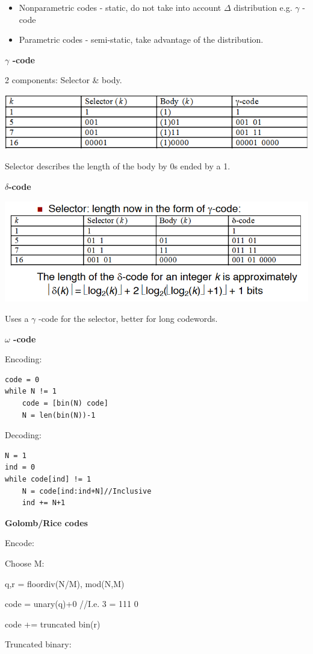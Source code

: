 \documentclass[a4paper,10pt,landscape]{article}
\begin{document}
\begin{multicols}{3}
\begin{itemize}
\item Nonparametric codes - static, do not take into account $\Delta$ distribution e.g. $\gamma$ -code
\item Parametric codes - semi-static, take advantage of the distribution.
\end{itemize}


\textbf{$\gamma$ -code}

2 components: Selector \& body.

\includegraphics[width=.75\linewidth]{images/gammacode.png}

Selector describes the length of the body by 0s ended by a 1.

\textbf{$\delta$-code}

\includegraphics[width=.75\linewidth]{images/deltacode.png}

Uses a $\gamma$ -code for the selector, better for long codewords.

\textbf{$\omega$ -code}

Encoding:
\begin{lstlisting}
code = 0
while N != 1
    code = [bin(N) code]
    N = len(bin(N))-1
\end{lstlisting}

Decoding:
\begin{lstlisting}
N = 1
ind = 0
while code[ind] != 1
    N = code[ind:ind+N]//Inclusive
    ind += N+1
\end{lstlisting}

\textbf{Golomb/Rice codes}

Encode:

Choose M:

q,r = floordiv(N/M), mod(N,M)

code = unary(q)+0 //I.e. 3 = 111 0

code += truncated bin(r)

Truncated binary:


\end{multicols}
\end{document}

